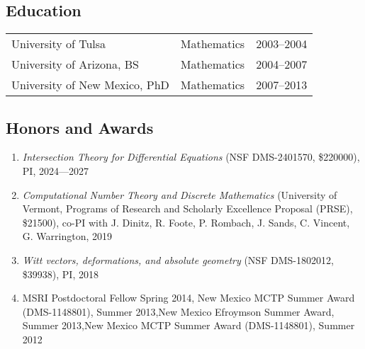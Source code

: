 \documentclass[a4paper,10pt]{article}
\begin{document}
 \subsection*{Education}
 \begin{flushleft}
\begin{tabular}{p{2in} p{1in}p{1in}}
University of Tulsa & Mathematics & 2003--2004 \\
University of Arizona, BS & Mathematics & 2004--2007\\
University of New Mexico, PhD &  Mathematics & 2007--2013
 \end{tabular}
 \end{flushleft}

\iffalse 
\subsection*{Research Interests}
Broad:  Algebraic Geometry, Differential Algebra, Number Theory, Applied Model Theory  \\
Specific: Deformation Theory, Diophantine Geometry, Differential Algebra and Witt vectors.
\fi 

\subsection*{Honors and Awards}
\begin{enumerate} \addtolength{\itemsep}{-0.5\baselineskip}
	\item \emph{Intersection Theory for Differential Equations} (NSF DMS-2401570, \$220000), PI, 2024---2027
	\item \emph{Computational Number Theory and Discrete Mathematics} (University of Vermont, Programs of Research and Scholarly Excellence Proposal (PRSE), \$21500), co-PI with  J. Dinitz, R. Foote, P. Rombach, J. Sands, C. Vincent, G. Warrington, 2019
	\item \emph{Witt vectors, deformations, and absolute geometry} (NSF DMS-1802012, \$39938), PI, 2018
	\item MSRI Postdoctoral Fellow Spring 2014, New Mexico MCTP Summer Award (DMS-1148801), Summer 2013,New Mexico Efroymson Summer Award, Summer 2013,New Mexico MCTP Summer Award (DMS-1148801), Summer 2012 
\end{enumerate}
\end{document}
